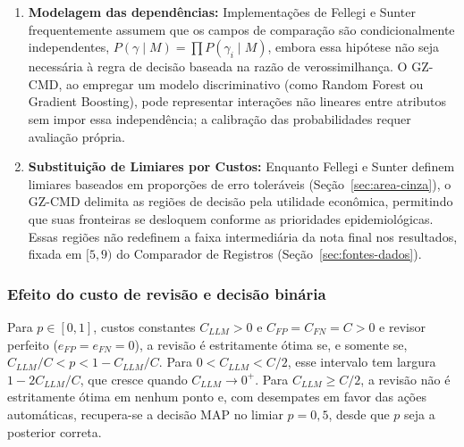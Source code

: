 \begin{enumerate}
\item \textbf{Modelagem das dependências:} Implementações de Fellegi e Sunter frequentemente assumem que os campos de comparação são condicionalmente independentes, $P(\gamma\mid M) = \prod P(\gamma_i\mid M)$, embora essa hipótese não seja necessária à regra de decisão baseada na razão de verossimilhança. O GZ-CMD, ao empregar um modelo discriminativo (como Random Forest ou Gradient Boosting), pode representar interações não lineares entre atributos sem impor essa independência; a calibração das probabilidades requer avaliação própria.
\item \textbf{Substituição de Limiares por Custos:} Enquanto Fellegi e Sunter definem limiares baseados em proporções de erro toleráveis (Seção~\ref{sec:area-cinza}), o GZ-CMD delimita as regiões de decisão pela utilidade econômica, permitindo que suas fronteiras se desloquem conforme as prioridades epidemiológicas. Essas regiões não redefinem a faixa intermediária da nota final nos resultados, fixada em $[5,9)$ do Comparador de Registros (Seção~\ref{sec:fontes-dados}).
\end{enumerate}

\subsubsection{Efeito do custo de revisão e decisão binária}

\begin{proposition}
Para $p\in[0,1]$, custos constantes $C_{LLM}>0$ e $C_{FP}=C_{FN}=C>0$ e revisor perfeito ($e_{FP}=e_{FN}=0$), a revisão é estritamente ótima se, e somente se, $C_{LLM}/C<p<1-C_{LLM}/C$. Para $0<C_{LLM}<C/2$, esse intervalo tem largura $1-2C_{LLM}/C$, que cresce quando $C_{LLM}\to0^+$. Para $C_{LLM}\ge C/2$, a revisão não é estritamente ótima em nenhum ponto e, com desempates em favor das ações automáticas, recupera-se a decisão MAP no limiar $p=0{,}5$, desde que $p$ seja a posterior correta.
\end{proposition}

